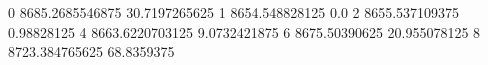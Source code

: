 0 8685.2685546875 30.7197265625
1 8654.548828125 0.0
2 8655.537109375 0.98828125
4 8663.6220703125 9.0732421875
6 8675.50390625 20.955078125
8 8723.384765625 68.8359375
